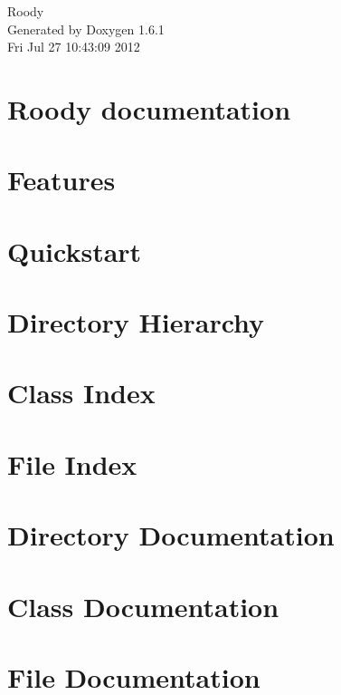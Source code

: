 \documentclass[letterpaper]{book}
\begin{document}
\begin{titlepage}
\vspace*{7cm}
\begin{center}
{\Large Roody }\\
\vspace*{1cm}
{\large Generated by Doxygen 1.6.1}\\
\vspace*{0.5cm}
{\small Fri Jul 27 10:43:09 2012}\\
\end{center}
\end{titlepage}
\clearemptydoublepage
{}
\tableofcontents
\clearemptydoublepage
{}
\chapter{Roody documentation}
\label{index}
\chapter{Features}
\label{features}

\chapter{Quickstart}
\label{quickstart}

\chapter{Directory Hierarchy}

\chapter{Class Index}

\chapter{File Index}

\chapter{Directory Documentation}


\chapter{Class Documentation}









\chapter{File Documentation}












\printindex
\end{document}
